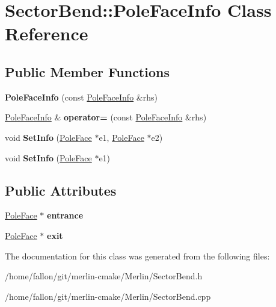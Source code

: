 \hypertarget{classSectorBend_1_1PoleFaceInfo}{}\section{Sector\+Bend\+:\+:Pole\+Face\+Info Class Reference}
\label{classSectorBend_1_1PoleFaceInfo}
\subsection*{Public Member Functions}
\begin{DoxyCompactItemize}
\item 
\mbox{\label{classSectorBend_1_1PoleFaceInfo_a36aeaeae11c826173dedf1cf99438536}} 
{\bfseries Pole\+Face\+Info} (const \hyperlink{classSectorBend_1_1PoleFaceInfo}{Pole\+Face\+Info} \&rhs)
\item 
\mbox{\label{classSectorBend_1_1PoleFaceInfo_aafe7919f96ef69bf2260577ab63d6acf}} 
\hyperlink{classSectorBend_1_1PoleFaceInfo}{Pole\+Face\+Info} \& {\bfseries operator=} (const \hyperlink{classSectorBend_1_1PoleFaceInfo}{Pole\+Face\+Info} \&rhs)
\item 
\mbox{\label{classSectorBend_1_1PoleFaceInfo_abfa97efbbe60db48f34be27b43e6b015}} 
void {\bfseries Set\+Info} (\hyperlink{classSectorBend_1_1PoleFace}{Pole\+Face} $\ast$e1, \hyperlink{classSectorBend_1_1PoleFace}{Pole\+Face} $\ast$e2)
\item 
\mbox{\label{classSectorBend_1_1PoleFaceInfo_a46c13b93e3e1c9f98ef59b32afbe146f}} 
void {\bfseries Set\+Info} (\hyperlink{classSectorBend_1_1PoleFace}{Pole\+Face} $\ast$e1)
\end{DoxyCompactItemize}
\subsection*{Public Attributes}
\begin{DoxyCompactItemize}
\item 
\mbox{\label{classSectorBend_1_1PoleFaceInfo_aedd867c93ab58daa3ee73da5a6647a95}} 
\hyperlink{classSectorBend_1_1PoleFace}{Pole\+Face} $\ast$ {\bfseries entrance}
\item 
\mbox{\label{classSectorBend_1_1PoleFaceInfo_aa938600306f6364c15117ee0a92d1354}} 
\hyperlink{classSectorBend_1_1PoleFace}{Pole\+Face} $\ast$ {\bfseries exit}
\end{DoxyCompactItemize}


The documentation for this class was generated from the following files\+:\begin{DoxyCompactItemize}
\item 
/home/fallon/git/merlin-\/cmake/\+Merlin/Sector\+Bend.\+h\item 
/home/fallon/git/merlin-\/cmake/\+Merlin/Sector\+Bend.\+cpp\end{DoxyCompactItemize}
